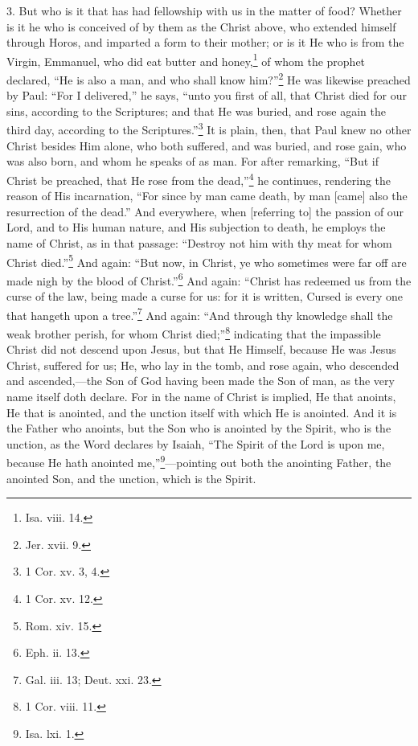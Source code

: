3. But who is it that has had fellowship with us in the matter of food? Whether is it he who is conceived of by them as the Christ above, who extended himself through Horos, and imparted a form to their mother; or is it He who is from the Virgin, Emmanuel, who did eat butter and honey,\footnote{Isa. viii. 14.} of whom the prophet declared, “He is also a man, and who shall know him?”\footnote{Jer. xvii. 9.} He was likewise preached by Paul: “For I delivered,” he says, “unto you first of all, that Christ died for our sins, according to the Scriptures; and that He was buried, and rose again the third day, according to the Scriptures.”\footnote{1 Cor. xv. 3, 4.} It is plain, then, that Paul knew no other Christ besides Him alone, who both suffered, and was buried, and rose gain, who was also born, and whom he speaks of as man. For after remarking, “But if Christ be preached, that He rose from the dead,”\footnote{1 Cor. xv. 12.} he continues, rendering the reason of His incarnation, “For since by man came death, by man [came] also the resurrection of the dead.” And everywhere, when [referring to] the passion of our Lord, and to His human nature, and His subjection to death, he employs the name of Christ, as in that passage: “Destroy not him with thy meat for whom Christ died.”\footnote{Rom. xiv. 15.} And again: “But now, in Christ, ye who sometimes were far off are made nigh by the blood of Christ.”\footnote{Eph. ii. 13.} And again: “Christ has redeemed us from the curse of the law, being made a curse for us: for it is written, Cursed is every one that hangeth upon a tree.”\footnote{Gal. iii. 13; Deut. xxi. 23.} And again: “And through thy knowledge shall the weak brother perish, for whom Christ died;”\footnote{1 Cor. viii. 11.} indicating that the impassible Christ did not descend upon Jesus, but that He Himself, because He was Jesus Christ, suffered for us; He, who lay in the tomb, and rose again, who descended and ascended,—the Son of God having been made the Son of man, as the very name itself doth declare. For in the name of Christ is implied, He that anoints, He that is anointed, and the unction itself with which He is anointed. And it is the Father who anoints, but the Son who is anointed by the Spirit, who is the unction, as the Word declares by Isaiah, “The Spirit of the Lord is upon me, because He hath anointed me,”\footnote{Isa. lxi. 1.}—pointing out both the anointing Father, the anointed Son, and the unction, which is the Spirit.

